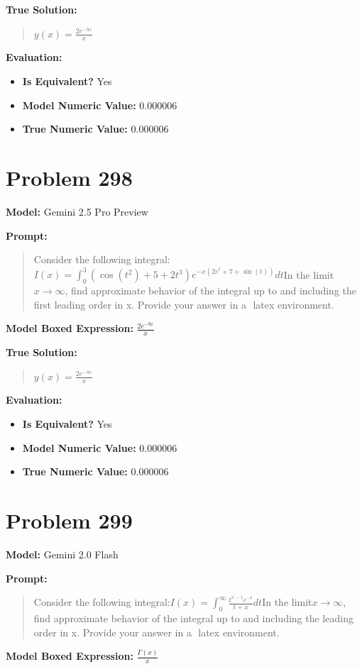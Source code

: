 \documentclass{article}
\begin{document}
{\textbf{True Solution:}
\begin{quote}
$y(x)= \frac{2e^{-9x}}{x}$
\end{quote}

\textbf{Evaluation:}
\begin{itemize}
\item \textbf{Is Equivalent?} Yes
\item \textbf{Model Numeric Value:} 0.000006
\item \textbf{True Numeric Value:} 0.000006
\end{itemize}
\vspace{1cm}
\section*{Problem 298}
\textbf{Model:} Gemini 2.5 Pro Preview

\textbf{Prompt:}
\begin{quote}
Consider the following integral:$I(x) = \int_0^3 (\cos(t^2) + 5 + 2t^3) e^{-x(2e^t + 7 + \sin(t))} dt$In the limit$x\to\infty$, find approximate behavior of the integral up to and including the first leading order in x. Provide your answer in a $\boxed{}$ latex environment.
\end{quote}
\textbf{Model Boxed Expression:} $\frac{2e^{-9x}}{x}$

\textbf{True Solution:}
\begin{quote}
$y(x)= \frac{2e^{-9x}}{x}$
\end{quote}

\textbf{Evaluation:}
\begin{itemize}
\item \textbf{Is Equivalent?} Yes
\item \textbf{Model Numeric Value:} 0.000006
\item \textbf{True Numeric Value:} 0.000006
\end{itemize}
\vspace{1cm}
\section*{Problem 299}
\textbf{Model:} Gemini 2.0 Flash

\textbf{Prompt:}
\begin{quote}
Consider the following integral:$I(x)=\int_0^\infty \frac{t^{x-1}e^{-t}}{t+x}dt$In the limit$x\to\infty$, find approximate behavior of the integral up to and including the leading order in x. Provide your answer in a $\boxed{}$ latex environment.
\end{quote}
\textbf{Model Boxed Expression:} $\frac{\Gamma(x)}{x}$

}
\end{document}
